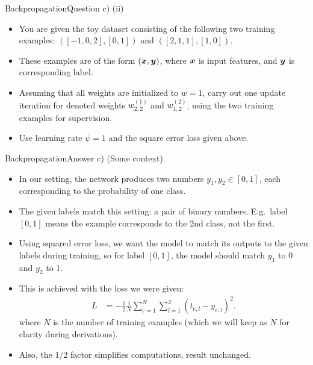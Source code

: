 \documentclass[t]{beamer}
\begin{document}
\begin{frame}{Backpropagation}{Question c) (ii)}
    \begin{itemize}
        \item You are given the toy dataset consisting of the following
              two training examples: $([-1, 0, 2], [0, 1])$ and
              $([2, 1, 1], [1, 0])$.
        \item These examples are of the form $({\boldsymbol{x}}, {\boldsymbol{y}})$, where ${\boldsymbol{x}}$
              is input features, and ${\boldsymbol{y}}$ is corresponding label.
        \item Assuming that all weights are initialized to $w = 1$, carry
              out one update iteration for denoted weights $w^{(1)}_{2,2}$
              and $w^{(2)}_{1,2}$, using the two training examples for
              supervision.
        \item Use learning rate $\psi = 1$ and the square error
              loss given above.
    \end{itemize}
\end{frame}

\begin{frame}{Backpropagation}{Answer c) (Some context)}
    \begin{itemize}
        \item In our setting, the network produces two numbers
              $y_1,y_2\in [0,1]$, each corresponding to the probability of one
              class.
        \item The given labels match this setting: a pair of binary numbers.
              E.g.\ label $[0,1]$ means the example corresponds to the 2nd
              class, not the first.
        \item Using squared error loss, we want the model to match its outputs
              to the given labels during training, so for label $[0,1]$, the
              model should match $y_1$ to 0 and $y_2$ to 1.
        \item This is achieved with the loss we were given:
              \begin{align*}
                  L & = -\frac{1}{2}\frac{1}{N}\sum_{e=1}^{N} \sum_{l=1}^{2} (t_{e,l}-y_{e,l})^2.
              \end{align*}
              where $N$ is the number of training examples (which we will keep
              as $N$ for clarity during derivations).
        \item Also, the $1/2$ factor simplifies computations, result unchanged.
    \end{itemize}
\end{frame}
\end{document}
